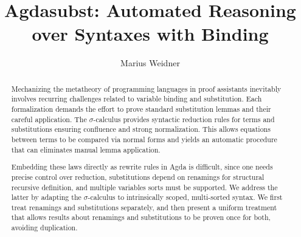 \documentclass[screen,nonacm]{acmart}
\begin{document}
\title{Agdasubst: Automated Reasoning over Syntaxes with Binding}

\author{Marius Weidner}

\begin{abstract}
      Mechanizing the metatheory of programming languages in proof assistants
      inevitably involves recurring challenges related to variable binding and
      substitution. Each formalization demands the effort to prove standard
      substitution lemmas and their careful application. The $σ$-calculus provides
      syntactic reduction rules for terms and substitutions ensuring confluence and
      strong normalization. This allows equations between terms to be compared via
      normal forms and yields an automatic procedure that can eliminates manual lemma
      application.

      Embedding these laws directly as rewrite rules in Agda is difficult, since one
      needs precise control over reduction, substitutions depend on renamings for
      structural recursive definition, and multiple variables sorts must be
      supported. We address the latter by adapting the $σ$-calculus to intrinsically
      scoped, multi-sorted syntax. We first treat renamings and substitutions
      separately, and then present a uniform treatment that allows results about
      renamings and substitutions to be proven once for both, avoiding duplication.
\end{abstract}
\end{document}
